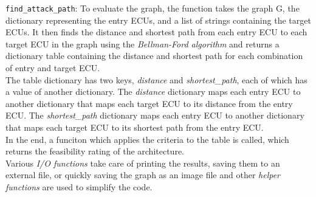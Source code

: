 \texttt{find\_attack\_path}: To evaluate the graph, the function takes the graph G,
the dictionary representing the entry ECUs, and a list of strings containing the target ECUs. 
It then finds the distance and shortest path from each entry ECU to each target ECU in the graph using the 
\textit{Bellman-Ford algorithm} and returns a dictionary table containing the distance and shortest path for each combination of entry and target ECU.\\

The table dictionary has two keys, \textit{distance} and \textit{shortest\_path}, each of which has a value of another dictionary. 
The \textit{distance} dictionary maps each entry ECU to another dictionary that maps each target ECU to its distance from the entry ECU. 
The \textit{shortest\_path} dictionary maps each entry ECU to another dictionary that maps each target ECU to its shortest path from the entry ECU.\\

In the end, a funciton which applies the criteria to the table is called, which returns the feasibility rating of the architecture.\\

Various \textit{I/O functions} take care of printing the results, saving them to an external file, or quickly saving the graph as an image file
and other \textit{helper functions} are used to simplify the code.